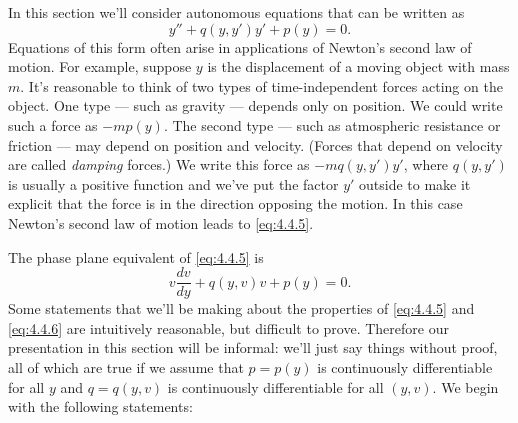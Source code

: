 In this section we'll consider  autonomous equations
that can be written as
\begin{equation} \label{eq:4.4.5}
y''+q(y,y')y'+p(y)=0.
\end{equation}
Equations of this form often arise in applications of Newton's second
law of
motion.
For example, suppose  $y$ is the displacement of a
moving object with mass $m$. It's  reasonable to think of two
types of time-independent forces acting on the object. One type --- such
as gravity --- depends only on position. We could write such a force as
$-mp(y)$. The second type --- such as atmospheric resistance or friction
--- may depend on position and velocity. (Forces that depend on velocity
are called \emph{\color{blue}damping} forces.) We  write this force as
$-mq(y,y')y'$, where $q(y,y')$ is usually a positive function and
we've put the factor $y'$ outside  to make it
explicit that the force
is in the direction opposing the motion. In this case Newton's second
law of
motion
leads to \eqref{eq:4.4.5}.

The phase plane equivalent of \eqref{eq:4.4.5} is
\begin{equation} \label{eq:4.4.6}
v\frac{dv}{dy}+q(y,v)v+p(y)=0.
\end{equation}
Some  statements that we'll be making about the properties of
\eqref{eq:4.4.5} and \eqref{eq:4.4.6} are intuitively reasonable, but
difficult to prove.
Therefore our presentation in this section will be informal: we'll
just say things without proof, all of which are true if we assume that
$p=p(y)$ is continuously differentiable for all $y$ and $q=q(y,v)$ is
continuously differentiable for all $(y,v)$.
 We begin with the following statements:

